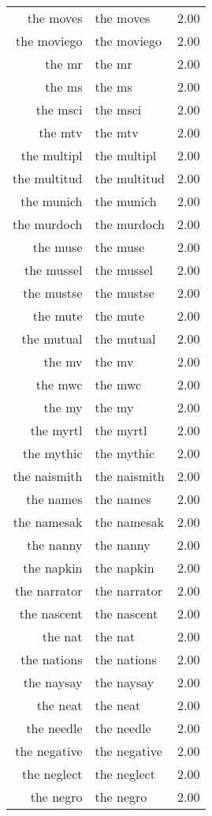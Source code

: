 \begin{table}[ht]
\begin{tabular}{rlr}
  the moves & the moves & 2.00 \\ 
  the moviego & the moviego & 2.00 \\ 
  the mr & the mr & 2.00 \\ 
  the ms & the ms & 2.00 \\ 
  the msci & the msci & 2.00 \\ 
  the mtv & the mtv & 2.00 \\ 
  the multipl & the multipl & 2.00 \\ 
  the multitud & the multitud & 2.00 \\ 
  the munich & the munich & 2.00 \\ 
  the murdoch & the murdoch & 2.00 \\ 
  the muse & the muse & 2.00 \\ 
  the mussel & the mussel & 2.00 \\ 
  the mustse & the mustse & 2.00 \\ 
  the mute & the mute & 2.00 \\ 
  the mutual & the mutual & 2.00 \\ 
  the mv & the mv & 2.00 \\ 
  the mwc & the mwc & 2.00 \\ 
  the my & the my & 2.00 \\ 
  the myrtl & the myrtl & 2.00 \\ 
  the mythic & the mythic & 2.00 \\ 
  the naismith & the naismith & 2.00 \\ 
  the names & the names & 2.00 \\ 
  the namesak & the namesak & 2.00 \\ 
  the nanny & the nanny & 2.00 \\ 
  the napkin & the napkin & 2.00 \\ 
  the narrator & the narrator & 2.00 \\ 
  the nascent & the nascent & 2.00 \\ 
  the nat & the nat & 2.00 \\ 
  the nations & the nations & 2.00 \\ 
  the naysay & the naysay & 2.00 \\ 
  the neat & the neat & 2.00 \\ 
  the needle & the needle & 2.00 \\ 
  the negative & the negative & 2.00 \\ 
  the neglect & the neglect & 2.00 \\ 
  the negro & the negro & 2.00 \\ 

\end{tabular}
\end{table}
